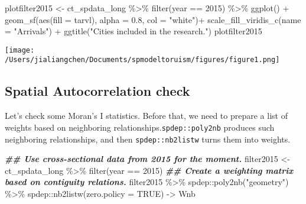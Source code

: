 \documentclass[
]{article}
\newenvironment{Shaded}{\begin{snugshade}}{\end{snugshade}}
\newcommand{\AttributeTok}[1]{\textcolor[rgb]{0.77,0.63,0.00}{#1}}
\newcommand{\ConstantTok}[1]{\textcolor[rgb]{0.00,0.00,0.00}{#1}}
\newcommand{\DecValTok}[1]{\textcolor[rgb]{0.00,0.00,0.81}{#1}}
\newcommand{\DocumentationTok}[1]{\textcolor[rgb]{0.56,0.35,0.01}{\textbf{\textit{#1}}}}
\newcommand{\FloatTok}[1]{\textcolor[rgb]{0.00,0.00,0.81}{#1}}
\newcommand{\FunctionTok}[1]{\textcolor[rgb]{0.00,0.00,0.00}{#1}}
\newcommand{\NormalTok}[1]{#1}
\newcommand{\OtherTok}[1]{\textcolor[rgb]{0.56,0.35,0.01}{#1}}
\newcommand{\SpecialCharTok}[1]{\textcolor[rgb]{0.00,0.00,0.00}{#1}}
\newcommand{\StringTok}[1]{\textcolor[rgb]{0.31,0.60,0.02}{#1}}
\begin{document}
\begin{Shaded}
\begin{Highlighting}[]
\NormalTok{plotfilter2015 }\OtherTok{\textless{}{-}}\NormalTok{ ct\_spdata\_long }\SpecialCharTok{\%\textgreater{}\%} \FunctionTok{filter}\NormalTok{(year }\SpecialCharTok{==} \DecValTok{2015}\NormalTok{) }\SpecialCharTok{\%\textgreater{}\%} \FunctionTok{ggplot}\NormalTok{() }\SpecialCharTok{+}
  \FunctionTok{geom\_sf}\NormalTok{(}\FunctionTok{aes}\NormalTok{(}\AttributeTok{fill =}\NormalTok{ tarvl), }\AttributeTok{alpha =} \FloatTok{0.8}\NormalTok{, }\AttributeTok{col =} \StringTok{"white"}\NormalTok{)}\SpecialCharTok{+}
  \FunctionTok{scale\_fill\_viridis\_c}\NormalTok{(}\AttributeTok{name =} \StringTok{"Arrivals"}\NormalTok{) }\SpecialCharTok{+}
  \FunctionTok{ggtitle}\NormalTok{(}\StringTok{"Cities included in the research."}\NormalTok{)}
\NormalTok{plotfilter2015}
\end{Highlighting}
\end{Shaded}

\texttt{[image: /Users/jialiangchen/Documents/spmodeltoruism/figures/figure1.png]}

\hypertarget{spatial-autocorrelation-check}{%
\subsection{Spatial Autocorrelation
check}\label{spatial-autocorrelation-check}}

Let's check some Moran's I statistics. Before that, we need to prepare a
list of weights based on neighboring
relationships.\texttt{spdep::poly2nb} produces such neighboring
relationships, and then \texttt{spdep::nb2listw} turns them into
weights.

\begin{Shaded}
\begin{Highlighting}[]
\DocumentationTok{\#\# Use cross{-}sectional data from 2015 for the moment.}
\NormalTok{filter2015 }\OtherTok{\textless{}{-}}\NormalTok{ ct\_spdata\_long }\SpecialCharTok{\%\textgreater{}\%} \FunctionTok{filter}\NormalTok{(year }\SpecialCharTok{==} \DecValTok{2015}\NormalTok{)}
\DocumentationTok{\#\# Create a weighting matrix based on contiguity relations.}
\NormalTok{filter2015 }\SpecialCharTok{\%\textgreater{}\%}\NormalTok{ spdep}\SpecialCharTok{::}\FunctionTok{poly2nb}\NormalTok{(}\StringTok{"geometry"}\NormalTok{) }\SpecialCharTok{\%\textgreater{}\%} 
\NormalTok{  spdep}\SpecialCharTok{::}\FunctionTok{nb2listw}\NormalTok{(}\AttributeTok{zero.policy =} \ConstantTok{TRUE}\NormalTok{) }\OtherTok{{-}\textgreater{}}\NormalTok{ Wnb}
\end{Highlighting}
\end{Shaded}
\end{document}
